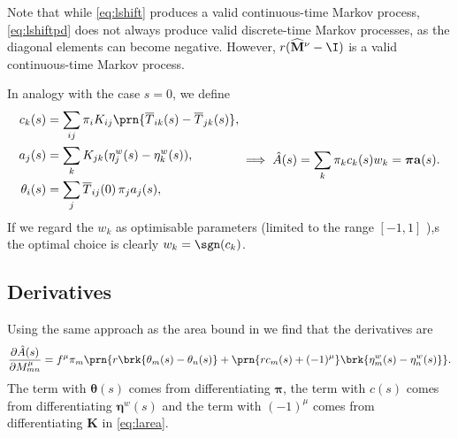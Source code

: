 \documentclass[12pt]{article}
\newcommand{\eqm}{\pi}
\newcommand{\eq}{\boldsymbol{\eqm}}
\newcommand{\fptm}{T}
\newcommand{\fptbm}{\overline{\fptm}}
\newcommand{\etwm}{\eta^w}
\newcommand{\etw}{\boldsymbol{\eta}^w}
\newcommand{\thbm}{\theta}
\newcommand{\thb}{\boldsymbol{\thbm}}
\newcommand{\wm}{w}
\newcommand{\w}{\mathbf{\wm}}
\newcommand{\MMdm}{M}
\newcommand{\MMd}{\mathbf{\MMdm}}
\newcommand{\encm}{K}
\newcommand{\enc}{\mathbf{\encm}}
\renewcommand{\pdiff}[2]{\frac{\partial #1}{\partial #2}}
\newcommand{\shift}[1]{\widehat{#1}}
\begin{document}
Note that while \cref{eq:lshift} produces a valid continuous-time Markov process, \cref{eq:lshiftpd} does not always produce valid discrete-time Markov processes, as the diagonal elements can become negative.
However, \(r (\shift{\MMd}^\nu - \I)\) is a valid continuous-time Markov process.

In analogy with the case \(s=0\), we define
%
\begin{equation}\label{eq:lareacoeffs}
  \begin{aligned}
    {c}_k(s) &= \sum_{ij} \eqm_i \encm_{ij} \prn{\fptbm_{ik}(s)-\fptbm_{jk}(s)}, \\
    {a}_j(s) &= \sum_{k} \encm_{jk} (\etwm_{j}(s) - \etwm_{k}(s)), \\
    \thbm_i(s) &= \sum_j \fptbm_{ij}(0)\, \eqm_j {a}_j(s), \\
  \end{aligned}
    \implies
    \hat{A}(s) 
      = \sum_k \eqm_k {c}_k(s) \wm_k
      = \eq \mathbf{a}(s).
\end{equation}
%
If we regard the \(\wm_k\) as optimisable parameters (limited to the range \( [-1,1] \) \wlg),s the optimal choice is clearly \( \wm_k = \sgn(c_k) \).


\subsection{Derivatives}\label{sec:lderiv}

Using the same approach as the area bound in \cite{Lahiri2013synapse} we find that the derivatives are
%
\begin{equation}\label{eq:lAdiff}
  \pdiff{\hat{A}(s)}{\MMdm^\mu_{mn}}
     = f^\mu \eqm_m \prn{ r \brk{\thbm_m(s) - \thbm_n(s)}
     +\prn{r {c}_m(s) + (-1)^\mu} \brk{\etwm_m(s) - \etwm_n(s)} }.
\end{equation}
%
The term with \(\thb(s)\) comes from differentiating \(\eq\), the term with \(c(s)\) comes from differentiating \(\etw(s)\) and the term with \((-1)^\mu\) comes from differentiating \(\enc\) in \eqref{eq:larea}.
\end{document}

